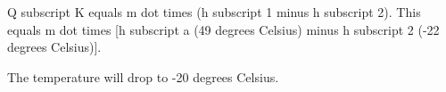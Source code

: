 Q subscript K equals m dot times (h subscript 1 minus h subscript 2).  
This equals m dot times [h subscript a (49 degrees Celsius) minus h subscript 2 (-22 degrees Celsius)].  

The temperature will drop to -20 degrees Celsius.